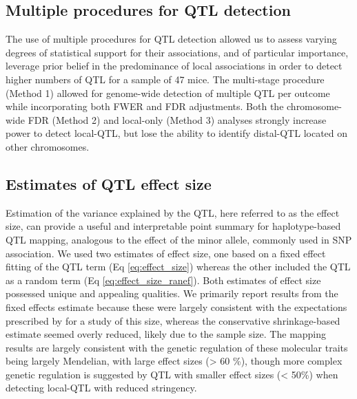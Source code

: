 \documentclass[9pt,twocolumn,twoside]{gsajnl}
\begin{document}
\subsection{Multiple procedures for QTL detection}

The use of multiple procedures for QTL detection allowed us to assess varying degrees of statistical support for their associations, and of particular importance, leverage prior belief in the predominance of local associations in order to detect higher numbers of QTL for a sample of 47 mice. The multi-stage procedure (Method 1) allowed for genome-wide detection of multiple QTL per outcome while incorporating both FWER and FDR adjustments. Both the chromosome-wide FDR (Method 2) and local-only (Method 3) analyses strongly increase power to detect local-QTL, but lose the ability to identify distal-QTL located on other chromosomes.



\subsection{Estimates of QTL effect size}

Estimation of the variance explained by the QTL, here referred to as the effect size, can provide a useful and interpretable point summary for haplotype-based QTL mapping, analogous to the effect of the minor allele, commonly used in SNP association. We used two estimates of effect size, one based on a fixed effect fitting of the QTL term (Eq \ref{eq:effect_size}) whereas the other included the QTL as a random term (Eq \ref{eq:effect_size_ranef}). Both estimates of effect size possessed unique and appealing qualities. We primarily report results from the fixed effects estimate because these were largely consistent with the expectations prescribed by \cite{KeeleSPARCC} for a study of this size, whereas the conservative shrinkage-based estimate seemed overly reduced, likely due to the sample size. The mapping results are largely consistent with the genetic regulation of these molecular traits being largely Mendelian, with large effect sizes (> 60 \%), though more complex genetic regulation is suggested by QTL with smaller effect sizes (< 50\%) when detecting local-QTL with reduced stringency.
\end{document}
